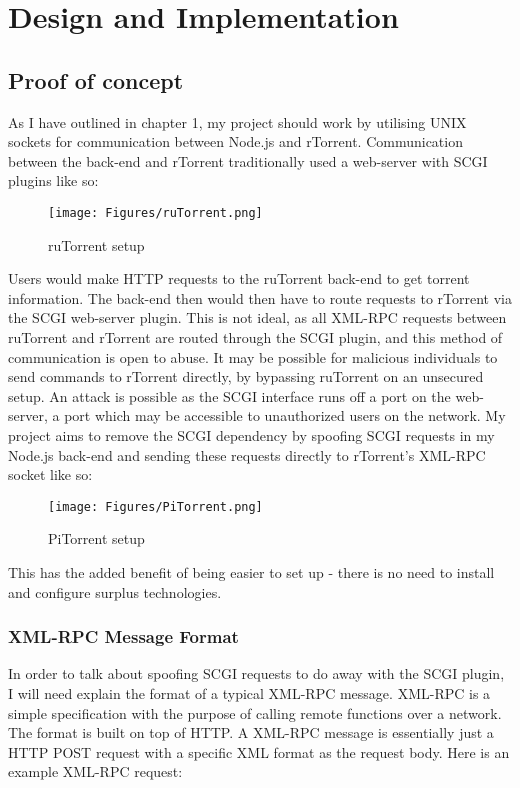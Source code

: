 \chapter{Design and Implementation} 

\label{Chapter3} 



\section{Proof of concept}
As I have outlined in chapter 1, my project should work by utilising UNIX sockets for communication between Node.js and rTorrent. Communication between the back-end and rTorrent traditionally used a web-server with SCGI plugins like so: 

\begin{figure}[h!]
  \centering
    \texttt{[image: Figures/ruTorrent.png]}
  \caption{ruTorrent setup}
\end{figure}

Users would make HTTP requests to the ruTorrent back-end to get torrent information. The back-end then would then have to route requests to rTorrent via the SCGI web-server plugin. This is not ideal, as all XML-RPC requests between ruTorrent and rTorrent are routed through the SCGI plugin, and this method of communication is open to abuse. It may be possible for malicious individuals to send commands to rTorrent directly, by bypassing ruTorrent on an unsecured setup. An attack is possible as the SCGI interface runs off a port on the web-server, a port which may be accessible to unauthorized users on the network. My project aims to remove the SCGI dependency by spoofing SCGI requests in my Node.js back-end and sending these requests directly to rTorrent's XML-RPC socket like so:

\begin{figure}[h!]
  \centering
    \texttt{[image: Figures/PiTorrent.png]}
  \caption{PiTorrent setup}
\end{figure}

This has the added benefit of being easier to set up - there is no need to install and configure surplus technologies.


\subsection{XML-RPC Message Format}
In order to talk about spoofing SCGI requests to do away with the SCGI plugin, I will need explain the format of a typical XML-RPC message. XML-RPC is a simple specification with the purpose of calling remote functions over a network. The format is built on top of HTTP. A XML-RPC message is essentially just a HTTP POST request with a specific XML format as the request body\cite{XML-RPC}. Here is an example XML-RPC request:

